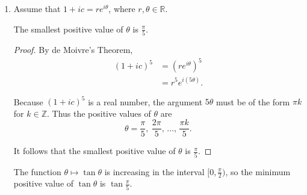 \begin{enumerate}
\begin{enumerate}
                Hence there are four real solutions for $c$:
                \begin{equation}
                    \begin{split} \label{eq:1}
                        c &= \sqrt{5 + 2\sqrt{5}} \quad \text{or} \quad \sqrt{5 - 2\sqrt{5}} \quad \text{or} \\
                        & \quad -\sqrt{5 + 2\sqrt{5}} \quad \text{or} \quad -\sqrt{5 - 2\sqrt{5}}.
                    \end{split}
                \end{equation}

                \bigskip

            \item Assume that $1 + ic = r e^{i \theta}$, where $r, \theta \in \mathbb{R}$.

                \begin{proposition} \label{prop:2}
                    The smallest positive value of $\theta$ is $\frac{\pi}{5}$.
                \end{proposition}

                \begin{proof}
                    By de Moivre's Theorem,
                    \begin{align*}
                        (1 + ic)^5 &= (r e^{i\theta})^5 \\
                        &= r^5 e^{i(5\theta)}.
                    \end{align*}

                    Because $(1 + ic)^5$ is a real number, the argument $5\theta$ must be of the form $\pi k$ for $k \in \mathbb{Z}$.
                    Thus the positive values of $\theta$ are
                    \[ \theta = \frac{\pi}{5}, \: \frac{2\pi}{5}, \, \ldots, \, \frac{\pi k}{5}. \]

                    It follows that the smallest positive value of $\theta$ is $\frac{\pi}{5}$.
                \end{proof}

                \begin{corollary}
                    The function $\theta \mapsto \tan \theta$ is increasing in the interval $[0, \frac{\pi}{2})$, so the minimum positive value of $\tan \theta$ is $\tan \frac{\pi}{5}$.
                \end{corollary}

                \bigskip


\end{enumerate}
\end{enumerate}
